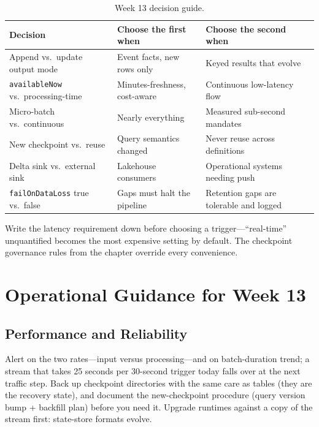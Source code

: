 \begin{table}[H]
\centering
\small
\begin{tabular}{@{}p{3.4cm}p{4.4cm}p{4.6cm}@{}}
\toprule
\textbf{Decision} & \textbf{Choose the first when} & \textbf{Choose the second when} \\
\midrule
Append vs.\ update output mode & Event facts, new rows only & Keyed results that evolve \\
\texttt{availableNow} vs.\ processing-time & Minutes-freshness, cost-aware & Continuous low-latency flow \\
Micro-batch vs.\ continuous & Nearly everything & Measured sub-second mandates \\
New checkpoint vs.\ reuse & Query semantics changed & Never reuse across definitions \\
Delta sink vs.\ external sink & Lakehouse consumers & Operational systems needing push \\
\texttt{failOnDataLoss} true vs.\ false & Gaps must halt the pipeline & Retention gaps are tolerable and logged \\
\bottomrule
\end{tabular}
\caption{Week 13 decision guide.}
\label{tab:ch13-decisions}
\end{table}

Write the latency requirement down before choosing a trigger---``real-time'' unquantified becomes the most expensive setting by default. The checkpoint governance rules from the chapter override every convenience.

\section{Operational Guidance for Week 13}
%
\subsection{Performance and Reliability}
Alert on the two rates---input versus processing---and on batch-duration trend; a stream that takes 25 seconds per 30-second trigger today falls over at the next traffic step. Back up checkpoint directories with the same care as tables (they are the recovery state), and document the new-checkpoint procedure (query version bump + backfill plan) before you need it. Upgrade runtimes against a copy of the stream first: state-store formats evolve.

